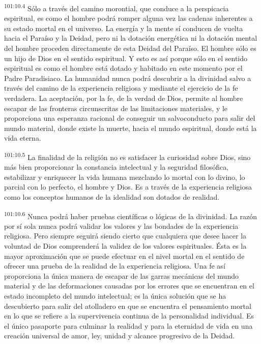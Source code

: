 \documentclass[twoside, 11pt]{book}
\begin{document}
\par
\textsuperscript{101:10.4} Sólo a través del camino morontial, que conduce a la perspicacia espiritual, es como el hombre podrá romper alguna vez las cadenas inherentes a su estado mortal en el universo. La energía y la mente sí conducen de vuelta hacia el Paraíso y la Deidad, pero ni la dotación energética ni la dotación mental del hombre proceden directamente de esta Deidad del Paraíso. El hombre sólo es un hijo de Dios en el sentido espiritual. Y esto es así porque sólo en el sentido espiritual es como el hombre está dotado y habitado en este momento por el Padre Paradisiaco. La humanidad nunca podrá descubrir a la divinidad salvo a través del camino de la experiencia religiosa y mediante el ejercicio de la fe verdadera. La aceptación, por la fe, de la verdad de Dios, permite al hombre escapar de las fronteras circunscritas de las limitaciones materiales, y le proporciona una esperanza racional de conseguir un salvoconducto para salir del mundo material, donde existe la muerte, hacia el mundo espiritual, donde está la vida eterna.

\par
\textsuperscript{101:10.5} La finalidad de la religión no es satisfacer la curiosidad sobre Dios, sino más bien proporcionar la constancia intelectual y la seguridad filosófica, estabilizar y enriquecer la vida humana mezclando lo mortal con lo divino, lo parcial con lo perfecto, el hombre y Dios. Es a través de la experiencia religiosa como los conceptos humanos de la idealidad son dotados de realidad.

\par
\textsuperscript{101:10.6} Nunca podrá haber pruebas científicas o lógicas de la divinidad. La razón por sí sola nunca podrá validar los valores y las bondades de la experiencia religiosa. Pero siempre seguirá siendo cierto que cualquiera que desee hacer la voluntad de Dios comprenderá la validez de los valores espirituales. Ésta es la mayor aproximación que se puede efectuar en el nivel mortal en el sentido de ofrecer una prueba de la realidad de la experiencia religiosa. Una fe así proporciona la única manera de escapar de las garras mecánicas del mundo material y de las deformaciones causadas por los errores que se encuentran en el estado incompleto del mundo intelectual; es la única solución que se ha descubierto para salir del atolladero en que se encuentra el pensamiento mortal en lo que se refiere a la supervivencia continua de la personalidad individual. Es el único pasaporte para culminar la realidad y para la eternidad de vida en una creación universal de amor, ley, unidad y alcance progresivo de la Deidad.
\end{document}
